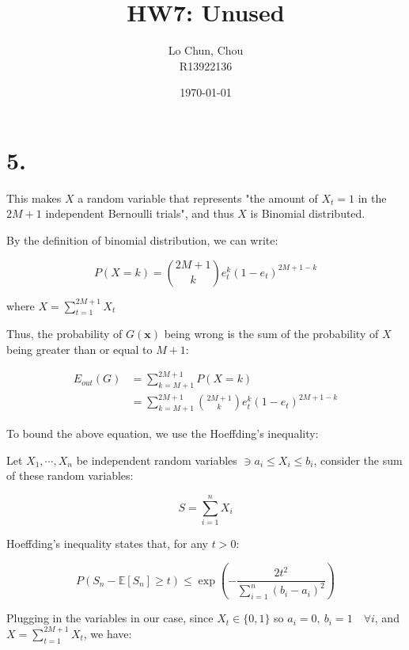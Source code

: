 \documentclass{article}
\title{HW7: Unused}
\author{Lo Chun, Chou \\ R13922136}
\date\today
\begin{document}
\setlength{\parindent}{0pt}
\maketitle 

\section*{5.}

This makes $X$ a random variable that represents "the amount of $X_t = 1$ in the $2M + 1$ independent Bernoulli trials",
and thus $X$ is Binomial distributed.
\bigskip

By the definition of binomial distribution, we can write:

\begin{equation*}
    P(X = k) = \binom{2M+1}{k} e_t^k (1 - e_t)^{2M+1-k}
\end{equation*}

where $X = \sum_{t=1}^{2M+1} X_t$
\bigskip

Thus, the probability of $G(\mathbf{x})$ being wrong is the sum of the probability of $X$ being greater than or equal to $M+1$:

\begin{equation*}
\begin{split}
    E_{out}(G) 
    &= \sum_{k = M+1}^{2M+1} P(X = k) \\
    &= \sum_{k = M+1}^{2M+1} \binom{2M+1}{k} e_t^k (1 - e_t)^{2M+1-k}
\end{split}
\end{equation*}

To bound the above equation, we use the Hoeffding's inequality:
\bigskip

\begin{mdframed}
Let $X_1,\cdots,X_n$ be independent random variables $\ni a_i \le X_i \le b_i$, consider the sum of these random variables:

\begin{equation*}
    S = \sum_{i=1}^{n} X_i
\end{equation*}

Hoeffding's inequality states that, for any $t>0$:

\begin{equation*}
P(S_n - \mathbb{E}[S_n] \ge t) \le \exp\left(-\frac{2t^2}{\sum_{i=1}^{n}(b_i - a_i)^2}\right) 
\end{equation*}
\end{mdframed}
Plugging in the variables in our case, since $X_t \in \{0, 1\}$ so $a_i = 0, \ b_i = 1 \quad \forall i$, and $X = \sum_{t=1}^{2M+1} X_t$, we have:
\end{document}

